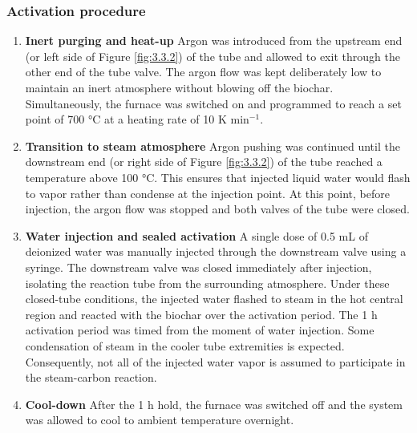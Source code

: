 \subsubsection*{Activation procedure}
\begin{enumerate}
    \item \textbf{Inert purging and heat-up} \newline
    Argon was introduced from the upstream end (or left side of Figure \ref{fig:3.3.2}) of the tube and allowed to exit through the other end of the tube valve. The argon flow was kept deliberately low to maintain an inert atmosphere without blowing off the biochar. Simultaneously, the furnace was switched on and programmed to reach a set point of 700 °C at a heating rate of 10 K min$^{-1}$.
    \item \textbf{Transition to steam atmosphere} \newline
    Argon pushing was continued until the downstream end (or right side of Figure \ref{fig:3.3.2}) of the tube reached a temperature above 100 °C. This ensures that injected liquid water would flash to vapor rather than condense at the injection point. At this point, before injection, the argon flow was stopped and both valves of the tube were closed.
    \item \textbf{Water injection and sealed activation} \newline
    A single dose of 0.5 mL of deionized water was manually injected through the downstream valve using a syringe. The downstream valve was closed immediately after injection, isolating the reaction tube from the surrounding atmosphere. Under these closed-tube conditions, the injected water flashed to steam in the hot central region and reacted with the biochar over the activation period. The 1 h activation period was timed from the moment of water injection. Some condensation of steam in the cooler tube extremities is expected. Consequently, not all of the injected water vapor is assumed to participate in the steam-carbon reaction.
    \item \textbf{Cool-down} \newline
    After the 1 h hold, the furnace was switched off and the system was allowed to cool to ambient temperature overnight.


\end{enumerate}
